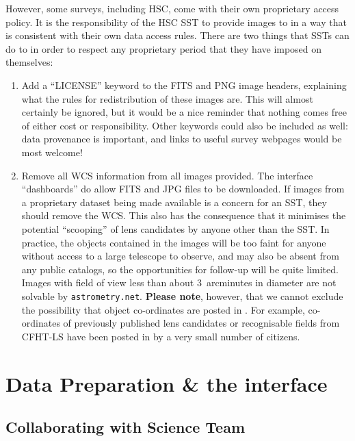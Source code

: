 \documentclass[a4paper,twocolumn]{article}
\begin{document}
However, some surveys, including HSC, come with their own proprietary
access policy. It is the responsibility of the HSC SST to provide
images to \SW in a way that is consistent with their own data access
rules. There are two things that SSTs can do to in order to respect
any proprietary period that they have imposed on themselves:
\begin{enumerate}

\item Add a ``LICENSE'' keyword to the FITS and PNG image headers, explaining
what the rules for redistribution of these images are. This will almost
certainly be ignored, but it would be a nice reminder that nothing comes free
of either cost or responsibility. Other keywords could also be included as
well: data provenance is important, and links to useful survey webpages would
be most welcome!

\item Remove all WCS information from all images provided. The \SW interface ``dashboards'' do allow FITS and JPG files to be downloaded. If images from a proprietary dataset being made available is a concern for an SST, they should remove the WCS. This also has the consequence that it minimises the potential ``scooping'' of  lens candidates by anyone other than the SST. 
In practice, the objects contained in the \SW images will be too faint
for anyone without access to a large telescope to observe, and may also be
absent from any public catalogs, so the opportunities for follow-up will be
quite limited. Images
with field of view less than about 3~arcminutes in diameter are not solvable
by \texttt{astrometry.net}. \textbf{Please note}, however, that we cannot exclude the possibility that object co-ordinates are posted in \Talk. For example, co-ordinates of previously published lens candidates or recognisable fields from CFHT-LS have been posted in \Talk by a very small number of citizens.

\end{enumerate}


\section{Data Preparation \& the \SW interface}
\label{sec:data}

\subsection{Collaborating with \SW Science Team}
\end{document}
